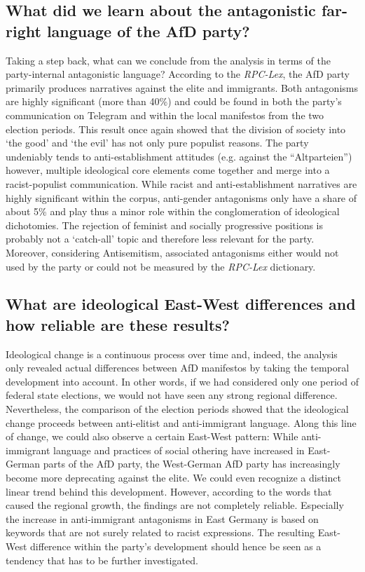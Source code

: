 \documentclass[a4paper]{scrreprt}
\begin{document}
\subsection*{What did we learn about the antagonistic far-right language of the AfD party?}
Taking a step back, what can we conclude from the analysis in terms of the party-internal antagonistic language? According to the {\em RPC-Lex}, the AfD party primarily produces narratives against the elite and immigrants. Both antagonisms are highly significant (more than 40\%) and could be found in both the party's communication on Telegram and within the local manifestos from the two election periods. This result once again showed that the division of society into `the good' and `the evil' has not only pure populist reasons. The party undeniably tends to anti-establishment attitudes (e.g. against the ``Altparteien'') however, multiple ideological core elements come together and merge into a racist-populist communication. While racist and anti-establishment narratives are highly significant within the corpus, anti-gender antagonisms only have a share of about 5\% and play thus a minor role within the conglomeration of ideological dichotomies. The rejection of feminist and socially progressive positions is probably not a `catch-all' topic and therefore less relevant for the party. Moreover, considering Antisemitism, associated antagonisms either would not used by the party or could not be measured by the {\em RPC-Lex} dictionary.
\subsection*{What are ideological East-West differences and how reliable are these results?}
Ideological change is a continuous process over time and, indeed, the analysis only revealed actual differences between AfD manifestos by taking the temporal development into account. In other words, if we had considered only one period of federal state elections, we would not have seen any strong regional difference. Nevertheless, the comparison of the election periods showed that the ideological change proceeds between anti-elitist and anti-immigrant language. Along this line of change, we could also observe a certain East-West pattern: While anti-immigrant language and practices of social othering have increased in East-German parts of the AfD party, the West-German AfD party has increasingly become more deprecating against the elite. We could even recognize a distinct linear trend behind this development. However, according to the words that caused the regional growth, the findings are not completely reliable. Especially the increase in anti-immigrant antagonisms in East Germany is based on keywords that are not surely related to racist expressions. The resulting East-West difference within the party's development should hence be seen as a tendency that has to be further investigated.
\end{document}
